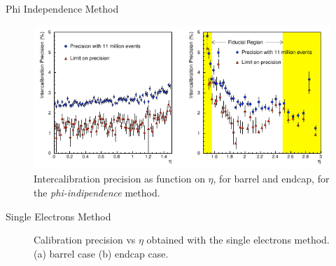 \documentclass[10pt]{beamer}
\begin{document}
\begin{frame}{Phi Independence Method}
    \begin{figure}
        \centering
        \includegraphics[width=\textwidth]{./img/intercalib_phi.png}
        \caption{Intercalibration precision as function on $\eta$, for barrel and endcap, for the \emph{phi-indipendence} method.}
        \label{fig:intercalib_phi}
    \end{figure}
\end{frame}



\begin{frame}{Single Electrons Method}
    \begin{figure}
        \centering
        \quad
        \caption{Calibration precision vs $\eta$ obtained with the single electrons method. (a) barrel case (b) endcap case.}
        \label{fig:single_electron}
    \end{figure}

\end{frame}
\end{document}
